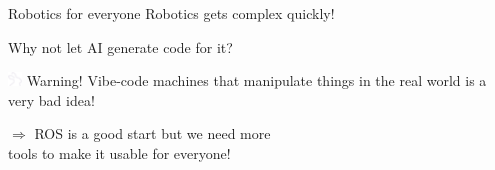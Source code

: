 \documentclass[aspectratio=169]{beamer}
\begin{document}
\begin{frame}{Robotics for everyone}
    \centering
      Robotics gets complex quickly!\\
      \pause
      
      \vspace{1em}
      Why not let AI generate code for it?
  
      \begin{minipage}{0.6\textwidth}
          \begin{alertblock}{\includegraphics[height=1em]{figures/hare_head_darkmode.pdf} Warning!}
              Vibe-code machines that manipulate things in the real world is a very bad idea!
          \end{alertblock}
  \end{minipage}

  \vspace{1em}
  $\Rightarrow$ ROS is a good start but we need more\\tools to make it usable for everyone!
\end{frame}
  
\end{document}
